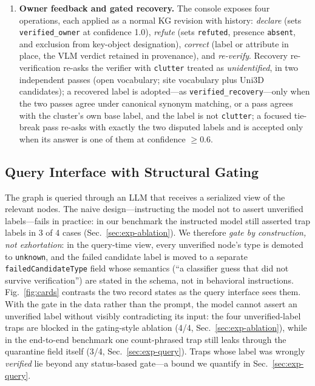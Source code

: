 \begin{enumerate}
first matching rule of a fixed cascade: outside-room ($>$50\% of points
beyond the filled room polygon), ceiling fixture (bottom $>$2.0\,m above
floor), wall remnant (wall-hug fraction---the fraction of cluster points
within 0.15\,m of the nearest grid wall line---$>$0.6 with PCA minor
extent $<$0.22\,m and a horizontal minor axis), or full-height wall band
($z$-span $>$2.5\,m, per-metre-segment median thickness $<$0.3\,m,
along-wall length $>$2\,m---the length condition spares wall-mounted
panels). Flagged clusters are removed upstream of verification.
\item \textbf{Owner feedback and gated recovery.} The console exposes
four operations, each applied as a normal KG revision with history:
\emph{declare} (sets \texttt{verified\_owner} at confidence 1.0),
\emph{refute} (sets \texttt{refuted}, presence \texttt{absent}, and
exclusion from key-object designation), \emph{correct} (label or
attribute in place, the VLM verdict retained in provenance), and
\emph{re-verify}. Recovery re-verification re-asks the verifier with
\texttt{clutter} treated as \emph{unidentified}, in two independent
passes (open vocabulary; site vocabulary plus Uni3D candidates); a
recovered label is adopted---as \texttt{verified\_recovery}---only when
the two passes agree under canonical synonym matching, or a pass agrees
with the cluster's own base label, and the label is not \texttt{clutter};
a focused tie-break pass re-asks with exactly the two disputed labels and
is accepted only when its answer is one of them at confidence $\ge$0.6.
\end{enumerate}

\subsection{Query Interface with Structural Gating}
\label{sec:query}

The graph is queried through an LLM that receives a serialized view of the
relevant nodes. The naive design---instructing the model not to assert
unverified labels---fails in practice: in our benchmark the instructed model
still asserted trap labels in 3 of 4 cases (Sec.~\ref{sec:exp-ablation}). We therefore
\emph{gate by construction, not exhortation}: in the query-time view, every
unverified node's type is demoted to \texttt{unknown}, and the failed
candidate label is moved to a separate \texttt{failedCandidateType} field
whose semantics (``a classifier guess that did not survive verification'') are
stated in the schema, not in behavioral instructions. Fig.~\ref{fig:cards}
contrasts the two record states as the query interface sees them. With the
gate in the data rather than the prompt, the model cannot assert an
unverified label without visibly contradicting its input: the four
unverified-label traps are blocked in the gating-style ablation (4/4,
Sec.~\ref{sec:exp-ablation}), while in the end-to-end benchmark one count-phrased trap still
leaks through the quarantine field itself (3/4, Sec.~\ref{sec:exp-query}). Traps whose
label was wrongly \emph{verified} lie beyond any status-based gate---a
bound we quantify in Sec.~\ref{sec:exp-query}.

